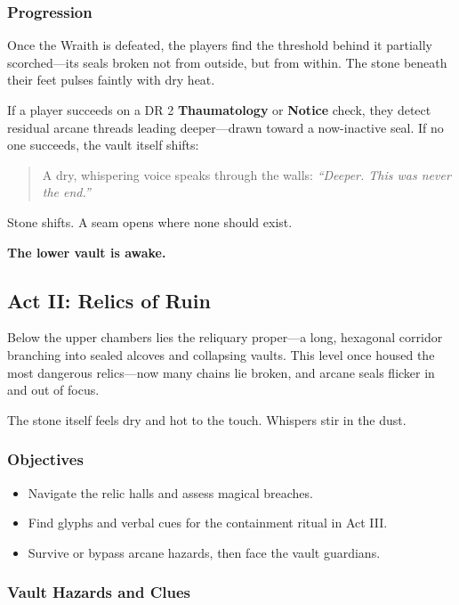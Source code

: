 \subsubsection*{Progression}

Once the Wraith is defeated, the players find the threshold behind it partially scorched—its seals broken not from outside, but from within. The stone beneath their feet pulses faintly with dry heat.

If a player succeeds on a DR 2 \textbf{Thaumatology} or \textbf{Notice} check, they detect residual arcane threads leading deeper—drawn toward a now-inactive seal. If no one succeeds, the vault itself shifts:

\begin{quote}
    A dry, whispering voice speaks through the walls: \emph{“Deeper. This was never the end.”} 
\end{quote}

Stone shifts. A seam opens where none should exist.


\textbf{The lower vault is awake.}


\subsection{Act II: Relics of Ruin}

Below the upper chambers lies the reliquary proper—a long, hexagonal corridor branching into sealed alcoves and collapsing vaults. This level once housed the most dangerous relics—now many chains lie broken, and arcane seals flicker in and out of focus.

The stone itself feels dry and hot to the touch. Whispers stir in the dust.

\subsubsection*{Objectives}
\begin{itemize}
    \item Navigate the relic halls and assess magical breaches.
    \item Find glyphs and verbal cues for the containment ritual in Act III.
    \item Survive or bypass arcane hazards, then face the vault guardians.
\end{itemize}

\subsubsection*{Vault Hazards and Clues}

